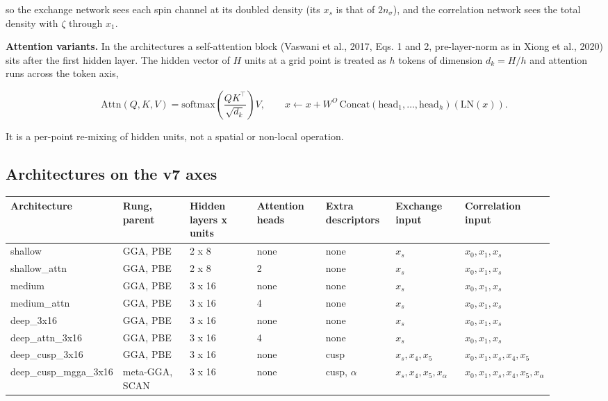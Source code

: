 \documentclass[10pt,a4paper]{article}
\begin{document}
so the exchange network sees each spin channel at its doubled density (its $x_s$ is that of
$2 n_\sigma$), and the correlation network sees the total density with $\zeta$ through $x_1$.

\textbf{Attention variants.} In the  architectures a self-attention block (Vaswani et al.,
2017, Eqs. 1 and 2, pre-layer-norm as in Xiong et al., 2020) sits after the first hidden layer.
The hidden vector of $H$ units at a grid point is treated as $h$ tokens of dimension $d_k = H/h$
and attention runs across the token axis,

\[
\mathrm{Attn}(Q, K, V) = \mathrm{softmax}\!\left(\frac{QK^{\top}}{\sqrt{d_k}}\right) V, \qquad
x \leftarrow x + W^{O}\,\mathrm{Concat}(\mathrm{head}_1, \ldots, \mathrm{head}_h)(\mathrm{LN}(x)).
\]

It is a per-point re-mixing of hidden units, not a spatial or non-local operation.

\subsection{Architectures on the v7 axes}

\begin{landscape}
\begin{tiny}
\begin{longtable}{p{0.13\linewidth}p{0.13\linewidth}p{0.13\linewidth}p{0.13\linewidth}p{0.13\linewidth}p{0.13\linewidth}p{0.13\linewidth}}
\toprule Architecture & Rung, parent & Hidden layers x units & Attention heads & Extra descriptors & Exchange input & Correlation input \\ \midrule \endhead
shallow & GGA, PBE & 2 x 8 & none & none & $x_s$ & $x_0, x_1, x_s$ \\
shallow\_attn & GGA, PBE & 2 x 8 & 2 & none & $x_s$ & $x_0, x_1, x_s$ \\
medium & GGA, PBE & 3 x 16 & none & none & $x_s$ & $x_0, x_1, x_s$ \\
medium\_attn & GGA, PBE & 3 x 16 & 4 & none & $x_s$ & $x_0, x_1, x_s$ \\
deep\_3x16 & GGA, PBE & 3 x 16 & none & none & $x_s$ & $x_0, x_1, x_s$ \\
deep\_attn\_3x16 & GGA, PBE & 3 x 16 & 4 & none & $x_s$ & $x_0, x_1, x_s$ \\
deep\_cusp\_3x16 & GGA, PBE & 3 x 16 & none & cusp & $x_s, x_4, x_5$ & $x_0, x_1, x_s, x_4, x_5$ \\
deep\_cusp\_mgga\_3x16 & meta-GGA, SCAN & 3 x 16 & none & cusp, $\alpha$ & $x_s, x_4, x_5, x_\alpha$ & $x_0, x_1, x_s, x_4, x_5, x_\alpha$ \\
\bottomrule \end{longtable}
\end{tiny}
\end{landscape}
\end{document}
